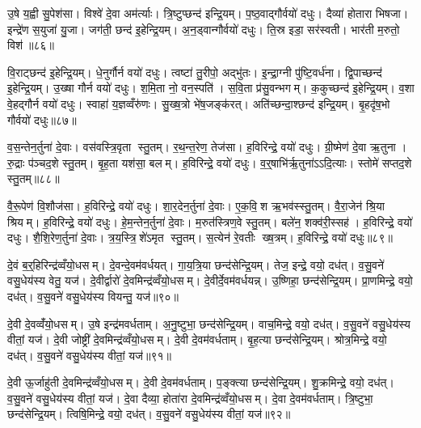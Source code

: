 उ॒षे य॒ह्वी सु॒पेश॑सा। विश्वे॑ दे॒वा अम॑र्त्याः। त्रि॒ष्टुप्छन्द॑ इन्द्रि॒यम्। प॒ष्ठ॒वाद्गौर्वयो॑ दधुः। दैव्या॑ होतारा भिषजा। इन्द्रे॑ण स॒युजा॑ यु॒जा। जग॑ती॒ छन्द॑ इ॒हेन्द्रि॒यम्। अ॒न॒ड्वान्गौर्वयो॑ दधुः। ति॒स्र इडा॒ सर॑स्वती। भार॑ती म॒रुतो॒ विश॑॥८६॥

वि॒राट्छन्द॑ इ॒हेन्द्रि॒यम्। धे॒नुर्गौर्न वयो॑ दधुः। त्वष्टा॑ तु॒रीपो॒ अद्भु॑तः। इ॒न्द्रा॒ग्नी पु॑ष्टि॒वर्ध॑ना। द्वि॒पाच्छन्द॑ इ॒हेन्द्रि॒यम्। उ॒ख्षा गौर्न वयो॑ दधुः। श॒मि॒ता नो॒ वन॒स्पति॑। स॒वि॒ता प्र॑सु॒वन्भगम्। क॒कुच्छन्द॑ इ॒हेन्द्रि॒यम्। व॒शा वे॒हद्गौर्न वयो॑ दधुः। स्वाहा॑ य॒ज्ञव्वँरु॑णः। सु॒ख्ष॒त्रो भे॑ष॒जङ्क॑रत्। अति॑च्छन्दा॒श्छन्द॑ इन्द्रि॒यम्। बृ॒हदृ॑ष॒भो गौर्वयो॑ दधुः॥८७॥\anuvakamend[अम॑र्त्यस्तुर्य॒वाड्गौर्वयो॑ दधु॒र्विशो॑ व॒शा वे॒हद्गौर्न वयो॑ दधुश्च॒त्वारि॑ च]

व॒स॒न्तेन॒र्तुना॑ दे॒वाः। वस॑वस्त्रि॒वृता स्तु॒तम्। र॒थ॒न्त॒रेण॒ तेज॑सा। ह॒विरिन्द्रे॒ वयो॑ दधुः। ग्री॒ष्मेण॑ दे॒वा ऋ॒तुना। रु॒द्राः प॑ञ्चद॒शे स्तु॒तम्। बृ॒ह॒ता यश॑सा॒ बलम्। ह॒विरिन्द्रे॒ वयो॑ दधुः। व॒र्॒षाभि॑र्\mbox{}ऋ॒तुना॑ऽऽदि॒त्याः। स्तोमे॑ सप्तद॒शे स्तु॒तम्॥८८॥

वै॒रू॒पेण॑ वि॒शौज॑सा। ह॒विरिन्द्रे॒ वयो॑ दधुः। शा॒र॒देन॒र्तुना॑ दे॒वाः। ए॒क॒वि॒श ऋ॒भव॑स्स्तु॒तम्। वै॒रा॒जेन॑ श्रि॒या श्रियम्। ह॒विरिन्द्रे॒ वयो॑ दधुः। हे॒म॒न्तेन॒र्तुना॑ दे॒वाः। म॒रुत॑स्त्रिण॒वे स्तु॒तम्। बले॑न॒ शक्व॑री॒स्सह॑। ह॒विरिन्द्रे॒ वयो॑ दधुः। शै॒शि॒रेण॒र्तुना॑ दे॒वाः। त्र॒य॒स्त्रि॒शे॑ऽमृत स्तु॒तम्। स॒त्येन॑ रे॒वतीः ख्ष॒त्रम्। ह॒विरिन्द्रे॒ वयो॑ दधुः॥८९॥\anuvakamend[स्तोमे॑ सप्तद॒शे स्तु॒त सहो॑ ह॒विरिन्द्रे॒ वयो॑ दधुश्च॒त्वारि॑ च (व॒स॒न्तेन॑ ग्री॒ष्मेण॑ व॒र्‌षाभि॑श्शार॒देन॑ हेम॒न्तेन॑ शैशि॒रेण॒ षट् ॥ )]

दे॒वं ब॒र्॒हिरिन्द्र॑व्वँयो॒धसम्। दे॒वन्दे॒वम॑वर्धयत्। गा॒य॒त्रि॒या छन्द॑सेन्द्रि॒यम्। तेज॒ इन्द्रे॒ वयो॒ दध॑त्। व॒सु॒वने॑ वसु॒धेय॑स्य वेतु॒ यज॑। दे॒वीर्द्वारो॑ दे॒वमिन्द्र॑व्वँयो॒धसम्। दे॒वीर्दे॒वम॑वर्धयन्न्। उ॒ष्णिहा॒ छन्द॑सेन्द्रि॒यम्। प्रा॒णमिन्द्रे॒ वयो॒ दध॑त्। व॒सु॒वने॑ वसु॒धेय॑स्य वियन्तु॒ यज॑॥९०॥

दे॒वी दे॒वव्वँ॑यो॒धसम्। उ॒षे इन्द्र॑मवर्धताम्। अ॒नु॒ष्टुभा॒ छन्द॑सेन्द्रि॒यम्। वाच॒मिन्द्रे॒ वयो॒ दध॑त्। व॒सु॒वने॑ वसु॒धेय॑स्य वीतां॒ यज॑। दे॒वी जोष्ट्री॑ दे॒वमिन्द्र॑व्वँयो॒धसम्। दे॒वी दे॒वम॑वर्धताम्। बृ॒ह॒त्या छन्द॑सेन्द्रि॒यम्। श्रोत्र॒मिन्द्रे॒ वयो॒ दध॑त्। व॒सु॒वने॑ वसु॒धेय॑स्य वीतां॒ यज॑॥९१॥

दे॒वी ऊ॒र्जाहु॑ती दे॒वमिन्द्र॑व्वँयो॒धसम्। दे॒वी दे॒वम॑वर्धताम्। प॒ङ्क्त्या छन्द॑सेन्द्रि॒यम्। शु॒क्रमिन्द्रे॒ वयो॒ दध॑त्। व॒सु॒वने॑ वसु॒धेय॑स्य वीतां॒ यज॑। दे॒वा दैव्या॒ होता॑रा दे॒वमिन्द्र॑व्वँयो॒धसम्। दे॒वा दे॒वम॑वर्धताम्। त्रि॒ष्टुभा॒ छन्द॑सेन्द्रि॒यम्। त्विषि॒मिन्द्रे॒ वयो॒ दध॑त्। व॒सु॒वने॑ वसु॒धेय॑स्य वीतां॒ यज॑॥९२॥

